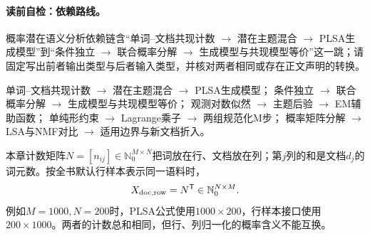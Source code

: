 \label{struct:V4-C06-CH04}
\paragraph{读前自检：依赖路线。}概率潜在语义分析依赖链含“单词--文档共现计数 $\to$ 潜在主题混合 $\to$ PLSA生成模型”到“条件独立 $\to$ 联合概率分解 $\to$ 生成模型与共现模型等价”这一跳；请固定写出前者输出类型与后者输入类型，并核对两者相同或存在正文声明的转换。\par

\begin{dependencybox}
单词--文档共现计数 $\to$ 潜在主题混合 $\to$ PLSA生成模型；
条件独立 $\to$ 联合概率分解 $\to$ 生成模型与共现模型等价；
观测对数似然 $\to$ 主题后验 $\to$ EM辅助函数；
单纯形约束 $\to$ Lagrange乘子 $\to$ 两组规范化M步；
概率矩阵分解 $\to$ LSA与NMF对比 $\to$ 适用边界与新文档折入。
\end{dependencybox}

\begin{keypointbox}[title=数据方向桥：PLSA的词--文档计数]
本章计数矩阵$N=[n_{ij}]\in\mathbb N_0^{M\times N}$把词放在行、文档放在列；第$j$列的和是文档$d_j$的词元数。按全书默认行样本表示同一语料时，
\[
X_{{\rm doc},{\rm row}}=N^{\mathsf T}
\in\mathbb N_0^{N\times M}.
\]
例如$M=1000,N=200$时，PLSA公式使用$1000\times200$，行样本接口使用$200\times1000$。两者的计数总和相同，但行、列归一化的概率含义不能互换。
\end{keypointbox}

